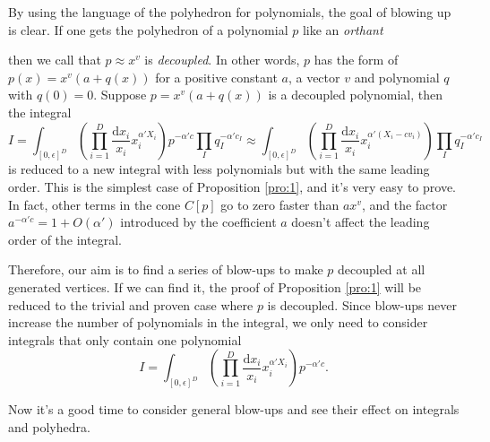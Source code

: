 \documentclass[12pt]{article}
\theoremstyle{definition}
\theoremstyle{plain}
\newcommand{\dif}{\mathrm{d}} %
\begin{document}
By using the language of the polyhedron for polynomials, the goal of blowing up is clear.
If one gets the polyhedron of a polynomial $p$ like an {\it{orthant}}
\begin{center}
\end{center}
then we call that $p\approx x^v$ is \emph{decoupled}. In other words, $p$ 
has the form of $p(x)=x^v(a+q(x))$ for a positive constant $a$, a vector $v$ and 
polynomial $q$ with $q(0)=0$. Suppose $p=x^v(a+q(x))$ is a decoupled polynomial, then
the integral
\[
	I=\int_{[0,\epsilon]^D} \left(\prod_{i=1}^D\frac{\dif x_i}{x_i}x_i^{\alpha' X_i}\right)
	p^{-\alpha' c} \prod_I q_I^{-\alpha' c_I}
	\approx\int_{[0,\epsilon]^D} \left(\prod_{i=1}^D\frac{\dif x_i}{x_i}x_i^{\alpha' (X_i-cv_i)}\right)
	\prod_I q_I^{-\alpha' c_I}
\] 
is reduced to a new integral with less polynomials but with the same leading order. 
This is the simplest case of Proposition \ref{pro:1}, and it's very easy to prove.
In fact, other terms in the cone $C[p]$ go to zero faster than $a x^v$,
and the factor $a^{-\alpha'c}=1+O(\alpha')$ introduced by the coefficient $a$ 
doesn't affect the leading order of the integral.

Therefore, our aim is to find a series of blow-ups to make $p$ decoupled at 
all generated vertices.
If we can find it, the proof of Proposition \ref{pro:1} will be reduced to the trivial 
and proven case where $p$ is decoupled.
Since blow-ups never increase the number of polynomials in the integral, 
we only need to consider integrals that only contain one 
polynomial
\[
	I=\int_{[0,\epsilon]^D} \left(\prod_{i=1}^D\frac{\dif x_i}{x_i}x_i^{\alpha' X_i}\right)
	p^{-\alpha' c}.
\] 

Now it's a good time to consider general blow-ups and see their effect on integrals and polyhedra. 
\end{document}
